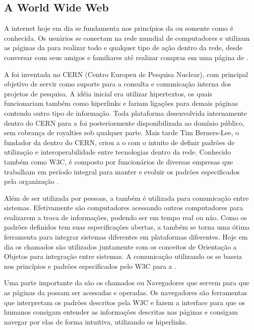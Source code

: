 \documentclass[espaco=simples,appendix=Name]{abnt}
\begin{document}
\begin{description}

\section{A World Wide Web}

\item \noindent
A internet hoje em dia se fundamenta nos princípios da  ou somente  como é conhecida. Os usuários se conectam na rede mundial de computadores e utilizam as páginas da  para realizar todo e qualquer tipo de ação dentro da rede, desde conversar com seus amigos e familiares até realizar compras em uma página de .

A  foi inventada no CERN (Centro Europeu de Pesquisa Nuclear), com principal objetivo de servir como suporte para a consulta e comunicação interna dos projetos de pesquisa\cite{WebStory}. A idéia inicial era utilizar hipertextos, os quais funcionariam também como hiperlinks e fariam ligações para demais páginas contendo outro tipo de informação. Toda plataforma desenvolvida internamente dentro do CERN para a  foi posteriormente disponibilizada ao domínio público, sem cobrança de royalties sob qualquer parte. Mais tarde Tim Berners-Lee, o fundador da  dentro do CERN, criou a o  com o intuito de definir padrões de utilização e interoperabilidade entre tecnologias dentro da rede. Conhecido também como W3C, é composto por funcionários de diversas empresas que trabalham em período integral para manter e evoluir os padrões especificados pela organização \cite{W3Cfacts}.

Além de ser utilizada por pessoas, a  também é utilizada para comunicação entre sistemas. Efetivamente são computadores acessando outros computadores para realizarem a troca de informações, podendo ser em tempo real ou não. Como os padrões definidos tem suas especificações abertas, a  também se torna uma ótima ferramenta para integrar sistemas diferentes em plataformas diferentes. Hoje em dia os chamados  são utilizados juntamente com os conceitos de Orientação a Objetos para integração entre sistemas. A comunicação utilizando os  se baseia nos princípios e padrões especificados pelo W3C para a  \cite{WebServices}.

Uma parte importante da  são os chamados  ou Navegadores que servem para que as páginas da  possam ser acessadas e operadas. Os navegadores são ferramentas que interpretam os padrões descritos pela W3C e fazem a interface para que os humanos consigam entender as informações descritas nas páginas e consigam navegar por elas de forma intuitiva, utilizando os hiperlinks.


\end{description}
\end{document}
